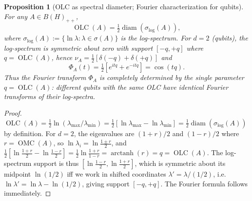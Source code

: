 \documentclass{article}
\newtheorem{proposition}[theorem]{Proposition}
\theoremstyle{remark}
\providecommand{\QLC}{\operatorname{OLC}}
\providecommand{\QMC}{\operatorname{OMC}}
\begin{document}
\begin{proposition}[OLC as spectral diameter; Fourier characterization for qubits]\label{prop:fourier-char}
For any $A\in B(H)_{++}$,
\[
\QLC(A) = \tfrac12\operatorname{diam}(\sigma_{\log}(A)),
\]
where $\sigma_{\log}(A):=\{\ln\lambda:\lambda\in\sigma(A)\}$ is the log-spectrum. For $d=2$ (qubits), the log-spectrum is symmetric about zero with support $[-q,+q]$ where $q=\QLC(A)$, hence $\nu_A=\tfrac12[\delta(-q)+\delta(+q)]$ and
\[
\Phi_A(t) = \tfrac12[e^{itq}+e^{-itq}] = \cos(tq).
\]
Thus the Fourier transform $\Phi_A$ is completely determined by the single parameter $q=\QLC(A)$: different qubits with the same OLC have identical Fourier transforms of their log-spectra.
\end{proposition}
\begin{proof}
$\QLC(A)=\tfrac12\ln(\lambda_{\max}/\lambda_{\min})=\tfrac12[\ln\lambda_{\max}-\ln\lambda_{\min}]=\tfrac12\operatorname{diam}(\sigma_{\log}(A))$ by definition. For $d=2$, the eigenvalues are $(1+r)/2$ and $(1-r)/2$ where $r=\QMC(A)$, so $\ln\lambda_i=\ln\frac{1\pm r}2$, and $\tfrac12[\ln\frac{1+r}{2}-\ln\frac{1-r}{2}]=\tfrac12\ln\frac{1+r}{1-r}=\operatorname{arctanh}(r)=q=\QLC(A)$. The log-spectrum support is thus $[\ln\frac{1-r}{2},\ln\frac{1+r}{2}]$, which is symmetric about its midpoint $\ln(1/2)$ iff we work in shifted coordinates $\lambda'=\lambda/(1/2)$, i.e. $\ln\lambda'=\ln\lambda-\ln(1/2)$, giving support $[-q,+q]$. The Fourier formula follows immediately.
\end{proof}
\end{document}
